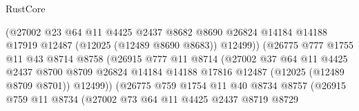 \begin{lexlean}{RustCore}
\begin{coremodule}
                                  (@27002
                                    @23
                                    @64
                                    @11
                                    @4425
                                    @2437
                                    @8682
                                    @8690
                                    @26824
                                    @14184
                                    @14188
                                    @17919
                                    @12487
                                    (@12025 (@12489 @8690 @8683))
                                    @12499))
                                (@26775
                                  @777
                                  @1755
                                  @11
                                  @43
                                  @8714
                                  @8758
                                  (@26915
                                    @777
                                    @11
                                    @8714
                                    (@27002
                                      @37
                                      @64
                                      @11
                                      @4425
                                      @2437
                                      @8700
                                      @8709
                                      @26824
                                      @14184
                                      @14188
                                      @17816
                                      @12487
                                      (@12025 (@12489 @8709 @8701))
                                      @12499))
                                  (@26775
                                    @759
                                    @1754
                                    @11
                                    @40
                                    @8734
                                    @8757
                                    (@26915
                                      @759
                                      @11
                                      @8734
                                      (@27002
                                        @73
                                        @64
                                        @11
                                        @4425
                                        @2437
                                        @8719
                                        @8729

\end{coremodule}
\end{lexlean}

